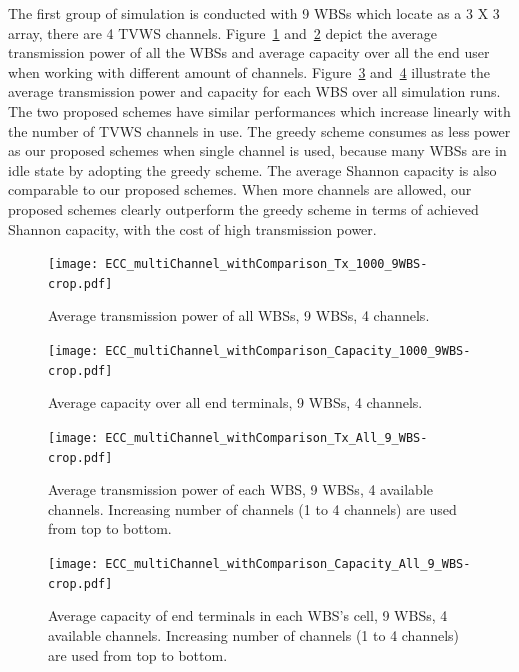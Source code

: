 \documentclass[times]{ettauth}
\theoremstyle{mytheoremstyle}
\theoremstyle{mytheoremstyle}
\theoremstyle{mytheoremstyle}
\begin{document}
The first group of simulation is conducted with 9 WBSs which locate as a 3 X 3 array, there are 4 TVWS channels.
Figure~\ref{transPower} and~\ref{ECC_multiChannel_Capacity} depict the average transmission power of all the WBSs and average capacity over all the end user when working with different amount of channels.
Figure~\ref{transPower_each_cell} and~\ref{ECC_multiChannel_Capacity_each_cell} illustrate the average transmission power and capacity for each WBS over all simulation runs. 
The two proposed schemes have similar performances which increase linearly with the number of TVWS channels in use.
The greedy scheme consumes as less power as our proposed schemes when single channel is used, because many WBSs are in idle state by adopting the greedy scheme.
The average Shannon capacity is also comparable to our proposed schemes.
When more channels are allowed, our proposed schemes clearly outperform the greedy scheme in terms of achieved Shannon capacity, with the cost of high transmission power.

 \begin{figure}[h!]
    \centering
      \texttt{[image: ECC\_multiChannel\_withComparison\_Tx\_1000\_9WBS-crop.pdf]}
    \caption{Average transmission power of all WBSs, 9 WBSs, 4 channels.}
\label{transPower}    
  \end{figure}
  
     \begin{figure}[h!]
       \centering
       \texttt{[image: ECC\_multiChannel\_withComparison\_Capacity\_1000\_9WBS-crop.pdf]}
       \caption{Average capacity over all end terminals,  9 WBSs, 4 channels.}
	\label{ECC_multiChannel_Capacity}
     \end{figure}
 \begin{figure}[h!]
    \centering
      \texttt{[image: ECC\_multiChannel\_withComparison\_Tx\_All\_9\_WBS-crop.pdf]}
    \caption{Average transmission power of each WBS, 9 WBSs, 4 available channels. Increasing number of channels (1 to 4 channels) are used from top to bottom.}
\label{transPower_each_cell}    
  \end{figure}
  
     \begin{figure}[h!]
       \centering
       \texttt{[image: ECC\_multiChannel\_withComparison\_Capacity\_All\_9\_WBS-crop.pdf]}
       \caption{Average capacity of end terminals in each WBS's cell,  9 WBSs, 4 available channels. Increasing number of channels (1 to 4 channels) are used from top to bottom.}
	\label{ECC_multiChannel_Capacity_each_cell}
     \end{figure}
\end{document}
